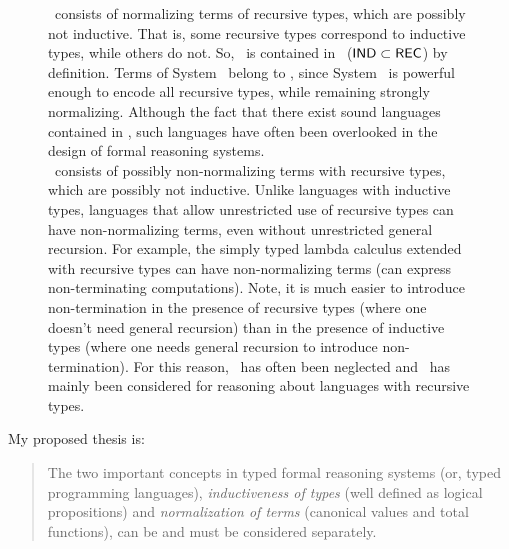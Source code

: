 \begin{figure}
{\begin{minipage}{\textwidth}
\REC\ consists of normalizing terms of recursive types, which are possibly
not inductive. That is, some recursive types correspond to inductive types,
while others do not. So, \IND\ is contained in \REC\ (\ie $\mathsf{IND}\subset\mathsf{REC}$)
by definition. Terms of System \F\ belong to \REC, since System \F\ is powerful
enough to encode all recursive types, while remaining strongly normalizing.
Although the fact that there exist sound languages contained in \REC, such
languages have often been overlooked in the design of formal reasoning systems.\\

\RECbot\ consists of possibly non-normalizing terms with recursive types,
which are possibly not inductive. Unlike languages with inductive types,
languages that allow unrestricted use of recursive types can have
non-normalizing terms, even without unrestricted general recursion.
For example, the simply typed lambda calculus extended with recursive types
can have non-normalizing terms (\ie can express non-terminating computations).
Note, it is much easier to introduce non-termination in the presence of
recursive types (where one doesn't need general recursion) than
in the presence of inductive types (where one needs general recursion
to introduce non-termination). For this reason, \REC\ has often been neglected
and \RECbot\ has mainly been considered for reasoning about languages
with recursive types.
\end{minipage}
}
\end{figure}

My proposed thesis is:
\begin{quote}
The two important concepts in typed formal reasoning systems (or,
typed programming languages), \emph{inductiveness of types}
(\ie well defined as logical propositions)
and \emph{normalization of terms} (\ie canonical values and total functions),
can be and must be considered separately.
\end{quote}


